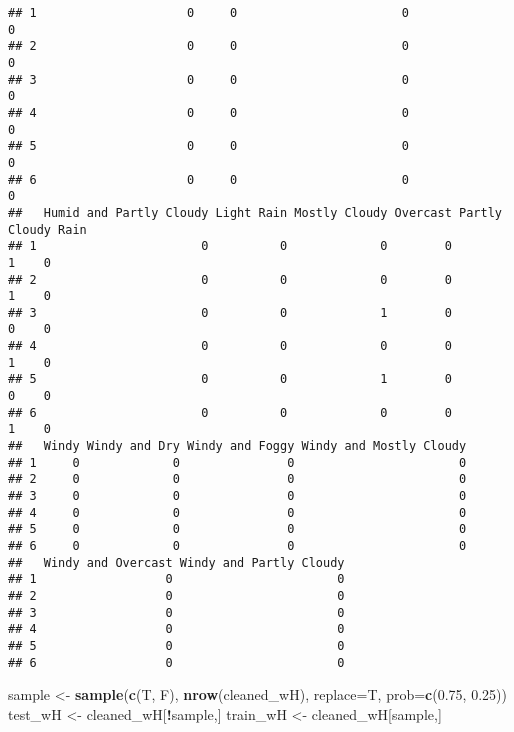 \documentclass[
]{article}
\newenvironment{Shaded}{\begin{snugshade}}{\end{snugshade}}
\newcommand{\AttributeTok}[1]{\textcolor[rgb]{0.13,0.29,0.53}{#1}}
\newcommand{\FloatTok}[1]{\textcolor[rgb]{0.00,0.00,0.81}{#1}}
\newcommand{\FunctionTok}[1]{\textcolor[rgb]{0.13,0.29,0.53}{\textbf{#1}}}
\newcommand{\NormalTok}[1]{#1}
\newcommand{\OtherTok}[1]{\textcolor[rgb]{0.56,0.35,0.01}{#1}}
\newcommand{\SpecialCharTok}[1]{\textcolor[rgb]{0.81,0.36,0.00}{\textbf{#1}}}
\begin{document}
\begin{verbatim}
## 1                     0     0                       0                  0
## 2                     0     0                       0                  0
## 3                     0     0                       0                  0
## 4                     0     0                       0                  0
## 5                     0     0                       0                  0
## 6                     0     0                       0                  0
##   Humid and Partly Cloudy Light Rain Mostly Cloudy Overcast Partly Cloudy Rain
## 1                       0          0             0        0             1    0
## 2                       0          0             0        0             1    0
## 3                       0          0             1        0             0    0
## 4                       0          0             0        0             1    0
## 5                       0          0             1        0             0    0
## 6                       0          0             0        0             1    0
##   Windy Windy and Dry Windy and Foggy Windy and Mostly Cloudy
## 1     0             0               0                       0
## 2     0             0               0                       0
## 3     0             0               0                       0
## 4     0             0               0                       0
## 5     0             0               0                       0
## 6     0             0               0                       0
##   Windy and Overcast Windy and Partly Cloudy
## 1                  0                       0
## 2                  0                       0
## 3                  0                       0
## 4                  0                       0
## 5                  0                       0
## 6                  0                       0
\end{verbatim}

\begin{Shaded}
\begin{Highlighting}[]
\NormalTok{sample }\OtherTok{\textless{}{-}} \FunctionTok{sample}\NormalTok{(}\FunctionTok{c}\NormalTok{(T, F), }\FunctionTok{nrow}\NormalTok{(cleaned\_wH), }\AttributeTok{replace=}\NormalTok{T, }\AttributeTok{prob=}\FunctionTok{c}\NormalTok{(}\FloatTok{0.75}\NormalTok{, }\FloatTok{0.25}\NormalTok{))}
\NormalTok{test\_wH }\OtherTok{\textless{}{-}}\NormalTok{ cleaned\_wH[}\SpecialCharTok{!}\NormalTok{sample,]}
\NormalTok{train\_wH }\OtherTok{\textless{}{-}}\NormalTok{ cleaned\_wH[sample,]}
\end{Highlighting}
\end{Shaded}
\end{document}
